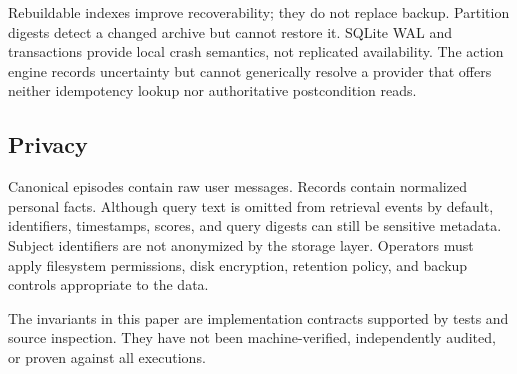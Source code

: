 Rebuildable indexes improve recoverability; they do not replace backup. Partition digests detect a changed archive but cannot restore it. SQLite WAL and transactions provide local crash semantics, not replicated availability. The action engine records uncertainty but cannot generically resolve a provider that offers neither idempotency lookup nor authoritative postcondition reads.

\subsection{Privacy}

Canonical episodes contain raw user messages. Records contain normalized personal facts. Although query text is omitted from retrieval events by default, identifiers, timestamps, scores, and query digests can still be sensitive metadata. Subject identifiers are not anonymized by the storage layer. Operators must apply filesystem permissions, disk encryption, retention policy, and backup controls appropriate to the data.

 The invariants in this paper are implementation contracts supported by tests and source inspection. They have not been machine-verified, independently audited, or proven against all executions.
